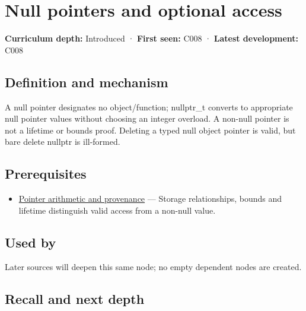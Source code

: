 \hypertarget{appendix-afae48c31800}{}\label{referencestart:appendix-afae48c31800}
\section{Null pointers and optional access}\label{appendix-afae48c31800-null-pointers-and-optional-access}

\textbf{Curriculum depth:} Introduced · \textbf{First seen:} C008 · \textbf{Latest development:} C008

\begin{allmightroledefinition}

\subsection{Definition and mechanism}\label{appendix-afae48c31800-definition-and-mechanism}

A null pointer designates no object/function; nullptr\_t converts to appropriate null pointer values without choosing an integer overload. A non-null pointer is not a lifetime or bounds proof. Deleting a typed null object pointer is valid, but bare delete nullptr is ill-formed.

\end{allmightroledefinition}

\subsection{Prerequisites}\label{appendix-afae48c31800-prerequisites}

\begin{itemize}
\tightlist
\item
  \hyperref[appendix-6af5921bc853]{Pointer arithmetic and provenance} --- Storage relationships, bounds and lifetime distinguish valid access from a non-null value.
\end{itemize}

\subsection{Used by}\label{appendix-afae48c31800-used-by}

Later sources will deepen this same node; no empty dependent nodes are created.

\subsection{Recall and next depth}\label{appendix-afae48c31800-recall-and-next-depth}

